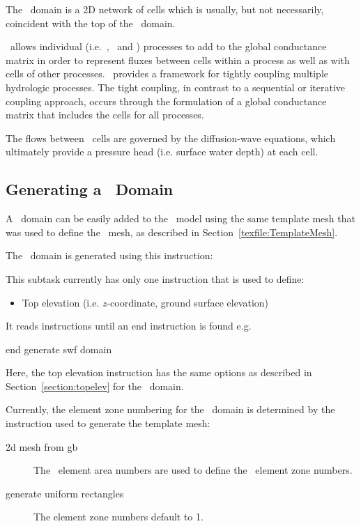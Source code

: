 \label{texfile:SWF}
The \swf\ domain is a 2D network of cells which is usually, but not necessarily, coincident with the top of the \gwf\ domain.

\mfus\ allows individual (i.e.\ \gwf, \swf\ and \cln)  processes  to add to the global
conductance matrix in order to represent fluxes between cells
within a process as well as with cells of other processes.
\mfus\ provides a framework for tightly
coupling multiple hydrologic processes. The tight coupling, in
contrast to a sequential or iterative coupling approach, occurs
through the formulation of a global conductance matrix that
includes the cells for all processes.

The flows between \swf\ cells are governed by the diffusion-wave equations, which ultimately provide a pressure head (i.e. surface water depth) at each cell.

\subsection{Generating a \swf\ Domain}
A \swf\ domain can be easily added to the \mfus\ model using the same template mesh that was used to define the \gwf\ mesh, as described in Section~\ref{texfile:TemplateMesh}.

The \swf\ domain is generated using this instruction:

    {This subtask currently has only one instruction that is used to define:
     \begin{itemize}
        \item Top elevation (i.e. $z$-coordinate, ground surface elevation)
    \end{itemize}

    It reads instructions until an \textsf{end} instruction is found e.g.\:


    {\Large \sf end generate swf domain}
    }

Here, the \textsf{top elevation} instruction has the same options as described in Section~\ref{section:topelev} for the \gwf\ domain.

Currently, the element zone numbering for the \swf\ domain is determined by the instruction used to generate the template mesh:
\begin{description}
  \item[2d mesh from gb] The \gb\ element area numbers are used to define the \mfus\ element zone numbers.
  \item[generate uniform rectangles] The element zone numbers default to 1.
\end{description}

